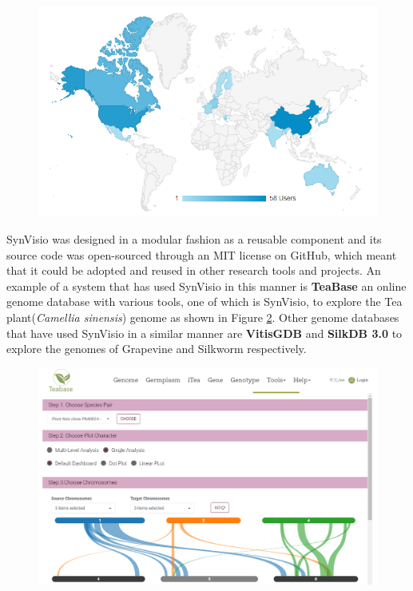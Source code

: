 \begin{figure}
  \centering
  \includegraphics[width=1\linewidth]{images/ch_6_users.PNG}
  \label{fig:ch_6_users}
\end{figure}


SynVisio was designed in a modular fashion as a reusable component and its source code was open-sourced through an MIT license on GitHub\cite{synvisio}, which meant that it could be adopted and reused in other research tools and projects. An example of a system that has used SynVisio in this manner is \textbf{TeaBase} an online genome database with various tools, one of which is SynVisio, to explore the Tea plant(\textit{Camellia sinensis}) genome as shown in Figure \ref{fig:ch_6_other}\cite{teabase}. Other genome databases that have used SynVisio in a similar manner are \textbf{VitisGDB} and  \textbf{SilkDB 3.0} to explore the genomes of Grapevine and Silkworm respectively\cite{lu2020silkdb,vitisgdb}.

\begin{figure}[h]
  \centering
  \includegraphics[width=1\linewidth]{images/ch_6_other.PNG}
  \label{fig:ch_6_other}
\end{figure}


